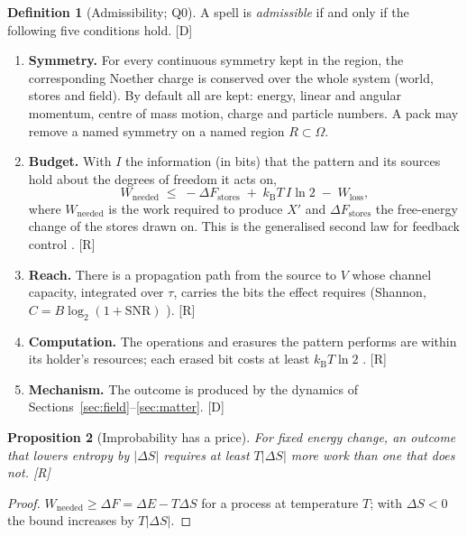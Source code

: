 \documentclass[11pt,a4paper]{article}
\numberwithin{equation}{section}
\theoremstyle{definition}
\newtheorem{definition}{Definition}[section]
\theoremstyle{plain}
\newtheorem{proposition}[definition]{Proposition}
\theoremstyle{remark}
\newcommand{\kB}{k_{\mathrm B}}
\newcommand{\abs}[1]{\left\lvert #1\right\rvert}
\newcommand{\tagD}{\textcolor{tag}{\textsf{[D]}}}
\newcommand{\tagR}{\textcolor{tag}{\textsf{[R]}}}
\begin{document}
\begin{definition}[Admissibility; Q0]\label{def:admissible}
A spell is \emph{admissible} if and only if the following five conditions hold. \tagD
\begin{enumerate}[label=(L\arabic*)]
\item \textbf{Symmetry.} For every continuous symmetry kept in the region, the corresponding Noether charge \cite{noether} is conserved over the whole system (world, stores and field). By default all are kept: energy, linear and angular momentum, centre of mass motion, charge and particle numbers. A pack may remove a named symmetry on a named region $R\subset\Omega$.
\item \textbf{Budget.} With $I$ the information (in bits) that the pattern and its sources hold about the degrees of freedom it acts on,
\begin{equation}\label{eq:budget}
W_{\text{needed}} \;\le\; -\Delta F_{\text{stores}} \;+\; \kB T\, I\ln 2 \;-\; W_{\text{loss}},
\end{equation}
where $W_{\text{needed}}$ is the work required to produce $X'$ and $\Delta F_{\text{stores}}$ the free-energy change of the stores drawn on. This is the generalised second law for feedback control \cite{sagawa}. \tagR
\item \textbf{Reach.} There is a propagation path from the source to $V$ whose channel capacity, integrated over $\tau$, carries the bits the effect requires (Shannon, $C = B\log_2(1+\mathrm{SNR})$ \cite{shannon}). \tagR
\item \textbf{Computation.} The operations and erasures the pattern performs are within its holder's resources; each erased bit costs at least $\kB T\ln 2$ \cite{landauer}. \tagR
\item \textbf{Mechanism.} The outcome is produced by the dynamics of Sections~\ref{sec:field}--\ref{sec:matter}. \tagD
\end{enumerate}
\end{definition}

\begin{proposition}[Improbability has a price]\label{prop:improb}
For fixed energy change, an outcome that lowers entropy by $\abs{\Delta S}$ requires at least $T\abs{\Delta S}$ more work than one that does not. \tagR
\end{proposition}
\begin{proof}
$W_{\text{needed}}\ge \Delta F = \Delta E - T\Delta S$ for a process at temperature $T$; with $\Delta S<0$ the bound increases by $T\abs{\Delta S}$.
\end{proof}
\end{document}
